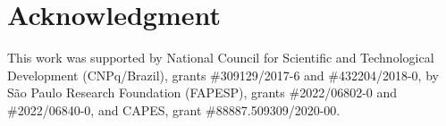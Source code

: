 \documentclass[12pt]{article}
\begin{document}
\section*{Acknowledgment}
This work was supported by National Council for Scientific and Technological Development (CNPq/Brazil), grants \#309129/2017-6 and \#432204/2018-0, by São Paulo Research Foundation (FAPESP), grants \#2022/06802-0 and \#2022/06840-0, and CAPES, grant \#88887.509309/2020-00.

\small


\end{document}
